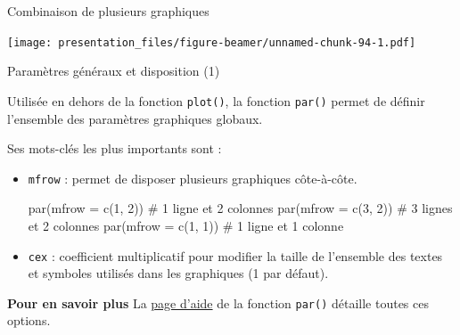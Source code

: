 \documentclass[12pt,handout,ignorenonframetext,]{beamer}
\newenvironment{Shaded}{}{}
\newcommand{\KeywordTok}[1]{\textcolor[rgb]{0.00,0.00,1.00}{{#1}}}
\newcommand{\DataTypeTok}[1]{{#1}}
\newcommand{\DecValTok}[1]{{#1}}
\newcommand{\StringTok}[1]{\textcolor[rgb]{0.00,0.50,0.50}{{#1}}}
\newcommand{\CommentTok}[1]{\textcolor[rgb]{0.00,0.50,0.00}{{#1}}}
\newcommand{\NormalTok}[1]{{#1}}
\renewenvironment{Shaded}{\begin{snugshade}}{\end{snugshade}}
\begin{document}
\begin{frame}[fragile]{Combinaison de plusieurs graphiques}

\footnotesize

\begin{Shaded}
\end{Shaded}

\texttt{[image: presentation\_files/figure-beamer/unnamed-chunk-94-1.pdf]}

\end{frame}

\begin{frame}[fragile]{Paramètres généraux et disposition (1)}

Utilisée en dehors de la fonction \texttt{plot()}, la fonction
\texttt{par()} permet de définir l'ensemble des paramètres graphiques
globaux.

\pause Ses mots-clés les plus importants sont :

\begin{itemize}
\item
  \texttt{mfrow} : permet de disposer plusieurs graphiques côte-à-côte.

\begin{Shaded}
\begin{Highlighting}[]
\KeywordTok{par}\NormalTok{(}\DataTypeTok{mfrow =} \KeywordTok{c}\NormalTok{(}\DecValTok{1}\NormalTok{, }\DecValTok{2}\NormalTok{)) }\CommentTok{# 1 ligne et 2 colonnes}
\KeywordTok{par}\NormalTok{(}\DataTypeTok{mfrow =} \KeywordTok{c}\NormalTok{(}\DecValTok{3}\NormalTok{, }\DecValTok{2}\NormalTok{)) }\CommentTok{# 3 lignes et 2 colonnes}
\KeywordTok{par}\NormalTok{(}\DataTypeTok{mfrow =} \KeywordTok{c}\NormalTok{(}\DecValTok{1}\NormalTok{, }\DecValTok{1}\NormalTok{)) }\CommentTok{# 1 ligne et 1 colonne}
\end{Highlighting}
\end{Shaded}
\item
  \texttt{cex} : coefficient multiplicatif pour modifier la taille de
  l'ensemble des textes et symboles utilisés dans les graphiques (1 par
  défaut).
\end{itemize}

\pause 

\textbf{Pour en savoir plus} La
\href{http://stat.ethz.ch/R-manual/R-devel/library/graphics/html/par.html}{page
d'aide} de la fonction \texttt{par()} détaille toutes ces options.

\end{frame}
\end{document}

